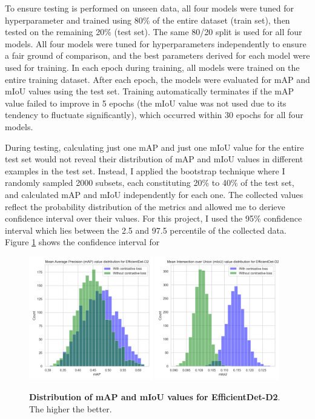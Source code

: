\documentclass[12pt,a4paper,twoside,openany]{report}
\begin{document}
To ensure testing is performed on unseen data, all four models were tuned for hyperparameter and trained using 80\% of the entire dataset (train set), then tested on the remaining 20\% (test set). The same 80/20 split is used for all four models. All four models were tuned for hyperparameters independently to ensure a fair ground of comparison, and the best parameters derived for each model were used for training. 
In each epoch during training, all models were trained on the entire training dataset. After each epoch, the models were evaluated for mAP and mIoU values using the test set. Training automatically terminates if the mAP value failed to improve in 5 epochs (the mIoU value was not used due to its tendency to fluctuate significantly), which occurred within 30 epochs for all four models.

During testing, calculating just one mAP and just one mIoU value for the entire test set would not reveal their distribution of mAP and mIoU values in different examples in the test set. Instead, I applied the bootstrap technique where I randomly sampled 2000 subsets, each constituting 20\% to 40\% of the test set, and calculated mAP and mIoU independently for each one. The collected values reflect the probability distribution of the metrics and allowed me to derieve confidence interval over their values. For this project, I used the 95\% confidence interval which lies between the 2.5 and 97.5 percentile of the collected data. Figure \ref{fig:d2_spread} shows the confidence interval for 

\begin{figure}[H]
    \centering
    \includegraphics[width=0.48\textwidth]{figs/eval/results/d2_map_spread.png}
    \includegraphics[width=0.48\textwidth]{figs/eval/results/d2_miou_spread.png}
    \caption{\textbf{Distribution of mAP and mIoU values for EfficientDet-D2}. The higher the better.}
    \label{fig:d2_spread}
\end{figure}
\end{document}
